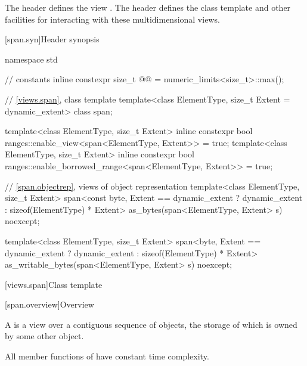\pnum
The header  defines the view .
The header  defines the class template  and
other facilities for interacting with these multidimensional views.

[span.syn]{Header  synopsis}%

%
\begin{codeblock}
namespace std {
  // constants
  inline constexpr size_t @@ = numeric_limits<size_t>::max();

  // \ref{views.span}, class template 
  template<class ElementType, size_t Extent = dynamic_extent>
    class span;

  template<class ElementType, size_t Extent>
    inline constexpr bool ranges::enable_view<span<ElementType, Extent>> = true;
  template<class ElementType, size_t Extent>
    inline constexpr bool ranges::enable_borrowed_range<span<ElementType, Extent>> = true;

  // \ref{span.objectrep}, views of object representation
  template<class ElementType, size_t Extent>
    span<const byte, Extent == dynamic_extent ? dynamic_extent : sizeof(ElementType) * Extent>
      as_bytes(span<ElementType, Extent> s) noexcept;

  template<class ElementType, size_t Extent>
    span<byte, Extent == dynamic_extent ? dynamic_extent : sizeof(ElementType) * Extent>
      as_writable_bytes(span<ElementType, Extent> s) noexcept;
}
\end{codeblock}

[views.span]{Class template }

[span.overview]{Overview}

\pnum
{}%
A  is a view over a contiguous sequence of objects,
the storage of which is owned by some other object.

\pnum
All member functions of  have constant time complexity.

